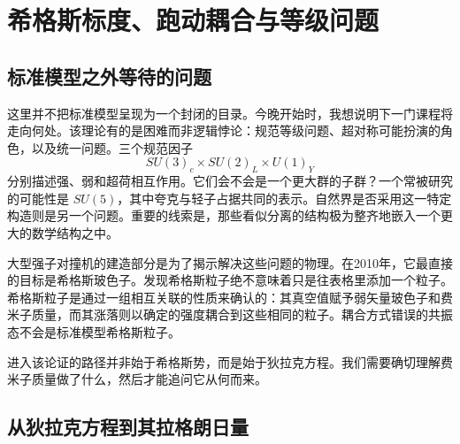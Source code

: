 \chapter{希格斯标度、跑动耦合与等级问题}


\section{标准模型之外等待的问题}

这里并不把标准模型呈现为一个封闭的目录。今晚开始时，我想说明下一门课程将走向何处。该理论有的是困难而非逻辑悖论：规范等级问题、超对称可能扮演的角色，以及统一问题。三个规范因子
\begin{equation}
  SU(3)_c\times SU(2)_L\times U(1)_Y
  \label{eq:l10-standard-model-group}
\end{equation}
分别描述强、弱和超荷相互作用。它们会不会是一个更大群的子群？一个常被研究的可能性是
\(SU(5)\)，其中夸克与轻子占据共同的表示。自然界是否采用这一特定构造则是另一个问题。重要的线索是，那些看似分离的结构极为整齐地嵌入一个更大的数学结构之中。

大型强子对撞机的建造部分是为了揭示解决这些问题的物理。在2010年，它最直接的目标是希格斯玻色子。发现希格斯粒子绝不意味着只是往表格里添加一个粒子。希格斯粒子是通过一组相互关联的性质来确认的：其真空值赋予弱矢量玻色子和费米子质量，而其涨落则以确定的强度耦合到这些相同的粒子。耦合方式错误的共振态不会是标准模型希格斯粒子。

进入该论证的路径并非始于希格斯势，而是始于狄拉克方程。我们需要确切理解费米子质量做了什么，然后才能追问它从何而来。

\section{从狄拉克方程到其拉格朗日量}

